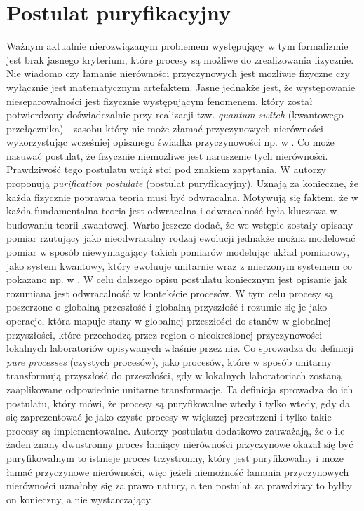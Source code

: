 \documentclass[10pt]{article} %
\begin{document}
\section{Postulat puryfikacyjny}
Ważnym aktualnie nierozwiązanym problemem występujący w tym formalizmie jest brak jasnego kryterium, które procesy są możliwe do zrealizowania fizycznie.
Nie wiadomo czy łamanie nierówności przyczynowych jest możliwie fizyczne czy wyłącznie jest matematycznym artefaktem. Jasne jednakże jest, że występowanie nieseparowalności jest fizycznie występującym fenomenem, który został potwierdzony doświadczalnie przy realizacji tzw. \textit{quantum switch}
(kwantowego przełącznika) - zasobu który nie może złamać przyczynowych nierówności - wykorzystując wcześniej opisanego świadka przyczynowości np. w \cite{experiment}. Co może nasuwać postulat, że fizycznie niemożliwe jest naruszenie tych nierówności. Prawdziwość tego postulatu wciąż stoi pod znakiem zapytania. W \cite{purification} autorzy proponują \textit{purification postulate} (postulat puryfikacyjny). Uznają za konieczne, że każda fizycznie poprawna teoria
musi być odwracalna. Motywują się faktem, że w każda fundamentalna teoria jest odwracalna i odwracalność była kluczowa w budowaniu teorii kwantowej.
Warto jeszcze dodać, że we wstępie zostały opisany pomiar rzutujący jako nieodwracalny rodzaj ewolucji jednakże można modelować pomiar w sposób niewymagający takich pomiarów modelując układ pomiarowy, jako system kwantowy, który ewoluuje unitarnie wraz z mierzonym systemem co pokazano np. w
\cite{reversible}. W celu dalszego opisu postulatu koniecznym jest opisanie jak rozumiana jest odwracalność w kontekście procesów. W tym celu procesy są poszerzone o globalną przeszłość i globalną przyszłość i rozumie się je jako operacje, która mapuje stany w globalnej przeszłości do stanów w globalnej przyszłości, które przechodzą przez region o nieokreślonej przyczynowości lokalnych laboratoriów opisywanych właśnie przez nie. Co sprowadza do definicji \textit{pure processes} (czystych procesów), jako procesów, które w sposób unitarny transformują przyszłość do przeszłości, gdy w lokalnych laboratoriach zostaną zaaplikowane odpowiednie unitarne transformacje. Ta definicja sprowadza do ich postulatu, który mówi, że procesy są puryfikowalne wtedy i tylko wtedy, gdy da się zaprezentować je jako czyste procesy w większej przestrzeni i tylko takie procesy są implementowalne. Autorzy postulatu dodatkowo zauważają, że
o ile żaden znany dwustronny proces łamiący nierówności przyczynowe okazał się być puryfikowalnym to istnieje proces trzystronny, który jest puryfikowalny i może łamać przyczynowe nierówności, więc jeżeli niemożność łamania przyczynowych nierówności uznałoby się za prawo natury, a ten postulat za prawdziwy to
byłby on konieczny, a nie wystarczający. 
\newpage


\end{document}
